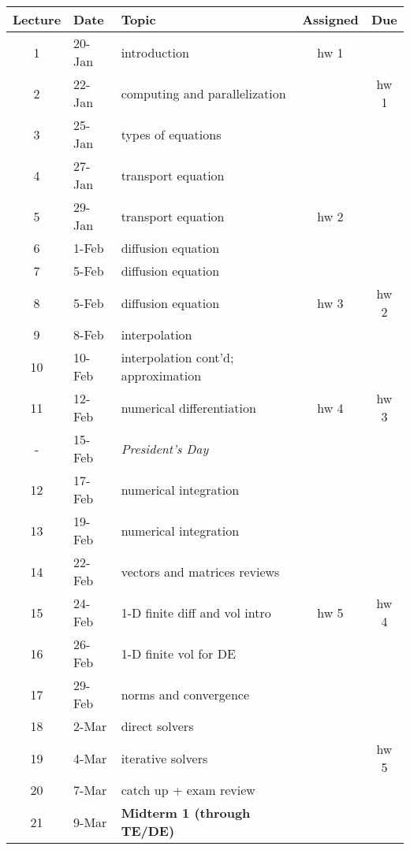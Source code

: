 \documentclass[12pt]{article}
\begin{document}
\clearpage
\begin{tabu}{| c | l | X | c | c |}
\hline
    Lecture & Date & Topic & Assigned & Due \\
    \hline
    1     & 20-Jan & introduction & hw 1  &  \\
    2     & 22-Jan & computing and parallelization &       & hw 1 \\
    3     & 25-Jan & types of equations &       &  \\
    4     & 27-Jan & transport equation &       &  \\
    5     & 29-Jan & transport equation & hw 2  &  \\
    6     & 1-Feb & diffusion equation &       &  \\
    7     & 5-Feb & diffusion equation &       &  \\
    8     & 5-Feb & diffusion equation & hw 3  & hw 2 \\
    9     & 8-Feb & interpolation &       &  \\
    10    & 10-Feb & interpolation cont'd; approximation &       &  \\
    11    & 12-Feb & numerical differentiation & hw 4  & hw 3 \\
    -     & 15-Feb & \textit{President's Day} &       &  \\
    12    & 17-Feb & numerical integration &       &  \\
    13    & 19-Feb & numerical integration &       &  \\
    14    & 22-Feb & vectors and matrices reviews &       &  \\
    15    & 24-Feb & 1-D finite diff and vol intro & hw 5  & hw 4 \\
    16    & 26-Feb & 1-D finite vol for DE &       &  \\
    17    & 29-Feb & norms and convergence &       &  \\
    18    & 2-Mar & direct solvers &       &  \\
    19    & 4-Mar & iterative solvers &       & hw 5 \\
    20    & 7-Mar & catch up + exam review &       &  \\
    21    & 9-Mar & \textbf{Midterm 1 (through TE/DE)} & \textbf{} &  \\
\hline
\end{tabu}%
\end{document}
